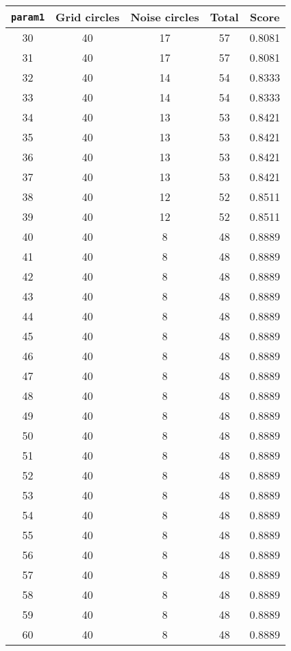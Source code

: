 \documentclass[letterpaper, 12pt]{article}
\begin{document}
\begin{longtable}{|c|c|c|c|c|}
\hline
\textbf{\texttt{param1}} & \textbf{Grid circles} & \textbf{Noise circles} & \textbf{Total} & \textbf{Score} \\
\hline
30 & 40 & 17 & 57 & 0.8081 \\
\hline
31 & 40 & 17 & 57 & 0.8081 \\
\hline
32 & 40 & 14 & 54 & 0.8333 \\
\hline
33 & 40 & 14 & 54 & 0.8333 \\
\hline
34 & 40 & 13 & 53 & 0.8421 \\
\hline
35 & 40 & 13 & 53 & 0.8421 \\
\hline
36 & 40 & 13 & 53 & 0.8421 \\
\hline
37 & 40 & 13 & 53 & 0.8421 \\
\hline
38 & 40 & 12 & 52 & 0.8511 \\
\hline
39 & 40 & 12 & 52 & 0.8511 \\
\hline
40 & 40 & 8 & 48 & 0.8889 \\
\hline
41 & 40 & 8 & 48 & 0.8889 \\
\hline
42 & 40 & 8 & 48 & 0.8889 \\
\hline
43 & 40 & 8 & 48 & 0.8889 \\
\hline
44 & 40 & 8 & 48 & 0.8889 \\
\hline
45 & 40 & 8 & 48 & 0.8889 \\
\hline
46 & 40 & 8 & 48 & 0.8889 \\
\hline
47 & 40 & 8 & 48 & 0.8889 \\
\hline
48 & 40 & 8 & 48 & 0.8889 \\
\hline
49 & 40 & 8 & 48 & 0.8889 \\
\hline
50 & 40 & 8 & 48 & 0.8889 \\
\hline
51 & 40 & 8 & 48 & 0.8889 \\
\hline
52 & 40 & 8 & 48 & 0.8889 \\
\hline
53 & 40 & 8 & 48 & 0.8889 \\
\hline
54 & 40 & 8 & 48 & 0.8889 \\
\hline
55 & 40 & 8 & 48 & 0.8889 \\
\hline
56 & 40 & 8 & 48 & 0.8889 \\
\hline
57 & 40 & 8 & 48 & 0.8889 \\
\hline
58 & 40 & 8 & 48 & 0.8889 \\
\hline
59 & 40 & 8 & 48 & 0.8889 \\
\hline
60 & 40 & 8 & 48 & 0.8889 \\
\hline

\end{longtable}
\end{document}
